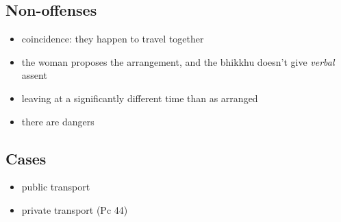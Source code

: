 \subsection{Non-offenses}

\begin{itemize}
\tightlist
\item
  coincidence: they happen to travel together
\item
  the woman proposes the arrangement, and the bhikkhu doesn't give
  \emph{verbal} assent
\item
  leaving at a significantly different time than as arranged
\item
  there are dangers
\end{itemize}

\subsection{Cases}

\begin{itemize}
\tightlist
\item
  public transport
\item
  private transport (Pc 44)
\end{itemize}

